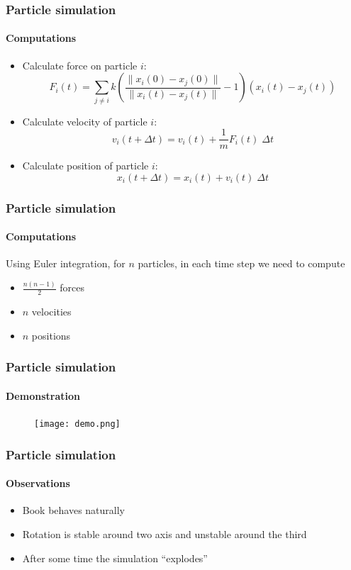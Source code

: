 \documentclass{beamer}
\begin{document}
\begin{frame}
 \frametitle{Particle simulation}
 \framesubtitle{Computations}
 \begin{itemize}
  \item Calculate force on particle $i$:
  \begin{displaymath}
   F_i(t) = \sum_{j \neq i} k \left( \frac{\|x_i(0) - x_j(0)\|}{\|x_i(t) - x_j(t)\|} - 1\right) \left(x_i(t) - x_j(t)\right)
  \end{displaymath}
  \item Calculate velocity of particle $i$:
  \begin{displaymath}
   v_i(t + \Delta t) = v_i(t) + \frac{1}{m} F_i(t) \; \Delta t
  \end{displaymath}
  \item Calculate position of particle $i$:
  \begin{displaymath}
   x_i(t + \Delta t) = x_i(t) + v_i(t) \; \Delta t
  \end{displaymath}
 \end{itemize}
\end{frame}

\begin{frame}
 \frametitle{Particle simulation}
 \framesubtitle{Computations}
 Using Euler integration, for $n$ particles, in each time step we need to compute
 \begin{itemize}
  \item $\frac{n(n-1)}{2}$ forces
  \item $n$ velocities
  \item $n$ positions
 \end{itemize}
\end{frame}

\begin{frame}
 \frametitle{Particle simulation}
 \framesubtitle{Demonstration}
 \begin{figure}
  \centering
  \texttt{[image: demo.png]}
 \end{figure}
\end{frame}

\begin{frame}
 \frametitle{Particle simulation}
 \framesubtitle{Observations}
 \begin{itemize}
  \item Book behaves naturally
  \item Rotation is stable around two axis and unstable around the third
  \item After some time the simulation ``explodes''
 \end{itemize}
\end{frame}
\end{document}
